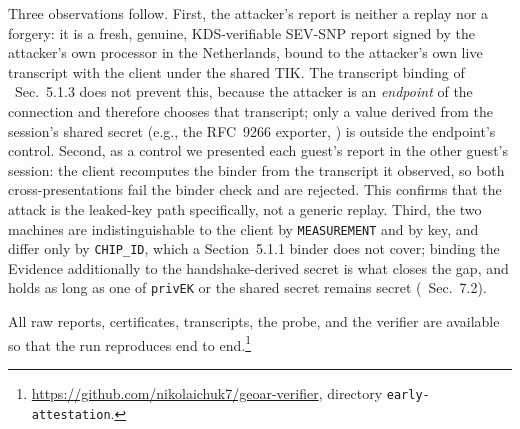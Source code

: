 Three observations follow. First, the attacker's report is neither a replay nor
a forgery: it is a fresh, genuine, KDS-verifiable SEV-SNP report signed by the
attacker's own processor in the Netherlands, bound to the attacker's own live
transcript with the client under the shared TIK. The transcript binding of
\spec{}~Sec.~5.1.3 does not prevent this, because the attacker is an
\emph{endpoint} of the connection and therefore chooses that transcript; only a
value derived from the session's shared secret (e.g., the RFC~9266 exporter,
) is outside the endpoint's control. Second, as a control we presented
each guest's report in the other guest's session: the client recomputes the
binder from the transcript it observed, so both cross-presentations fail the
binder check and are rejected. This confirms that the attack is the leaked-key
path specifically, not a generic replay. Third, the two machines are
indistinguishable to the client by \texttt{MEASUREMENT} and by key, and differ
only by \texttt{CHIP\_ID}, which a Section~5.1.1 binder does not cover; binding
the Evidence additionally to the handshake-derived secret is what closes the
gap, and holds as long as one of \texttt{privEK} or the shared secret remains
secret (\paper{}~Sec.~7.2).

All raw reports, certificates, transcripts, the probe, and the verifier are
available so that the run reproduces end to end.\footnote{\url{https://github.com/nikolaichuk7/geoar-verifier}, directory \texttt{early-attestation}.}

